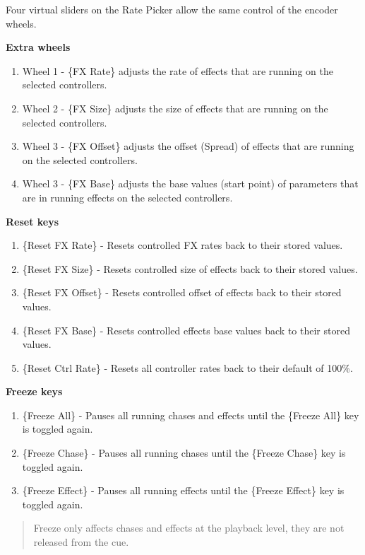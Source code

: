 \documentclass[
]{article}
\begin{document}
Four virtual sliders on the Rate Picker allow the same control of the encoder wheels.

\textbf{Extra wheels}

\begin{enumerate}
\def\labelenumi{\arabic{enumi}.}
\item
  Wheel 1 - \{FX Rate\} adjusts the rate of effects that are running on the selected controllers.
\item
  Wheel 2 - \{FX Size\} adjusts the size of effects that are running on the selected controllers.
\item
  Wheel 3 - \{FX Offset\} adjusts the offset (Spread) of effects that are running on the selected controllers.
\item
  Wheel 3 - \{FX Base\} adjusts the base values (start point) of parameters that are in running effects on the selected controllers.
\end{enumerate}

\textbf{Reset keys}

\begin{enumerate}
\def\labelenumi{\arabic{enumi}.}
\item
  \{Reset FX Rate\} - Resets controlled FX rates back to their stored values.
\item
  \{Reset FX Size\} - Resets controlled size of effects back to their stored values.
\item
  \{Reset FX Offset\} - Resets controlled offset of effects back to their stored values.
\item
  \{Reset FX Base\} - Resets controlled effects base values back to their stored values.
\item
  \{Reset Ctrl Rate\} - Resets all controller rates back to their default of 100\%.
\end{enumerate}

\textbf{Freeze keys}

\begin{enumerate}
\def\labelenumi{\arabic{enumi}.}
\item
  \{Freeze All\} - Pauses all running chases and effects until the \{Freeze All\} key is toggled again.
\item
  \{Freeze Chase\} - Pauses all running chases until the \{Freeze Chase\} key is toggled again.
\item
  \{Freeze Effect\} - Pauses all running effects until the \{Freeze Effect\} key is toggled again.
\end{enumerate}

\begin{quote}
Freeze only affects chases and effects at the playback level, they are not released from the cue.
\end{quote}
\end{document}
